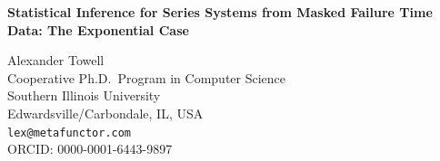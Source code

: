 \documentclass[12pt]{article}
\begin{document}
\thispagestyle{empty}

\begin{center}
{\Large\bfseries Statistical Inference for Series Systems from Masked Failure Time Data: The Exponential Case}

\bigskip\bigskip

Alexander Towell\\[6pt]
Cooperative Ph.D.\ Program in Computer Science\\
Southern Illinois University\\
Edwardsville/Carbondale, IL, USA\\[6pt]
\texttt{lex@metafunctor.com}\\[4pt]
ORCID: 0000-0001-6443-9897
\end{center}
\end{document}
